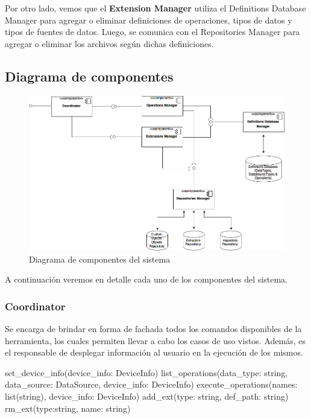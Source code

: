 Por otro lado, vemos que el \textbf{Extension Manager} utiliza el Definitions Database Manager para agregar o eliminar definiciones de operaciones, tipos de datos y tipos de fuentes de datos. Luego, se comunica con el Repositories Manager para agregar o eliminar los archivos según dichas definiciones.

\subsection{Diagrama de componentes}
\begin{figure}[H]
    \begin{center}
        \includegraphics[scale=0.40]{figures/diagrama_de_componentes}
        \caption{Diagrama de componentes del sistema}
        \label{DiagramaComponentes}
    \end{center}
\end{figure}

A continuación veremos en detalle cada uno de los componentes del sistema.

\subsubsection{Coordinator}
Se encarga de brindar en forma de fachada todos los comandos disponibles de la herramienta, los cuales permiten llevar a cabo los casos de uso vistos. Además, es el responsable de desplegar información al usuario en la ejecución de los mismos.
\newline

\begin{python}[title=Interfaz Coordinator, captionpos=b]
set_device_info(device_info: DeviceInfo)
list_operations(data_type: string, data_source: DataSource,
                device_info: DeviceInfo)
execute_operations(names: list(string), device_info: DeviceInfo)
add_ext(type: string, def_path: string)
rm_ext(type:string, name: string)
\end{python}

